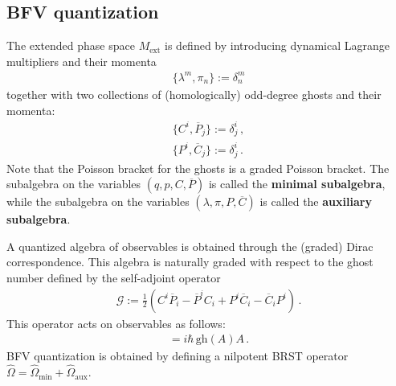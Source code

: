\subsection{BFV quantization}

    The extended phase space $M_{\text{ext}}$ is defined by introducing dynamical Lagrange multipliers and their momenta
    \begin{gather}
        \{\lambda^m,\pi_n\} := \delta^m_n
    \end{gather}
    together with two collections of (homologically) odd-degree ghosts and their momenta:
    \begin{gather}
        \{C^i,\overline{P}_j\} := \delta^i_j\,,\\
        \{P^i,\overline{C}_j\} := \delta^i_j\,.
    \end{gather}
    Note that the Poisson bracket for the ghosts is a graded Poisson bracket. The subalgebra on the variables $(q,p,C,\overline{P})$ is called the \textbf{minimal subalgebra}, while the subalgebra on the variables $(\lambda,\pi,P,\overline{C})$ is called the \textbf{auxiliary subalgebra}.

    A quantized algebra of observables is obtained through the (graded) Dirac correspondence. This algebra is naturally graded with respect to the ghost number defined by the self-adjoint operator
    \begin{gather}
        \mathcal{G} := \frac{1}{2}\left(C^i\overline{P}_i - \overline{P}^iC_i + P^i\overline{C}_i - \overline{C}_iP^i\right)\,.
    \end{gather}
    This operator acts on observables as follows:
    \begin{gather}
        [\mathcal{G},A] = i\hbar\,\mathrm{gh}(A)A\,.
    \end{gather}
    BFV quantization is obtained by defining a nilpotent BRST operator $\widehat{\Omega}=\widehat{\Omega}_{\text{min}}+\widehat{\Omega}_{\text{aux}}$.